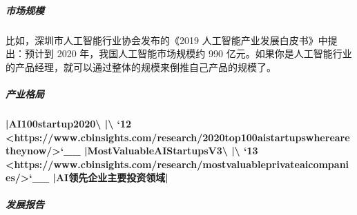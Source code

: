 \documentclass[letterpaper,11pt,english]{sphinxmanual}
\begin{document}
\subparagraph{市场规模}
\label{\detokenize{chapter_project/AI_industry_analysis:id5}}
比如，深圳市人工智能行业协会发布的《2019
人工智能产业发展白皮书》中提出：预计到 2020 年，我国人工智能市场规模约
990
亿元。如果你是人工智能行业的产品经理，就可以通过整体的规模来倒推自己产品的规模了。
%
\begin{footnote}[641]\sphinxAtStartFootnote
{}
%
\end{footnote}


\subparagraph{产业格局}
\label{\detokenize{chapter_project/AI_industry_analysis:id6}}
\begin{center}\end{center}%
\begin{footnote}[642]\sphinxAtStartFootnote
{}
%
\end{footnote} \begin{center}\end{center}
{\color{red}\bfseries{}|AI\sphinxhyphen{}100\sphinxhyphen{}startup\sphinxhyphen{}2020\textbackslash{} |\textbackslash{} `12 <https://www.cbinsights.com/research/2020\sphinxhyphen{}top\sphinxhyphen{}100\sphinxhyphen{}ai\sphinxhyphen{}startups\sphinxhyphen{}where\sphinxhyphen{}are\sphinxhyphen{}they\sphinxhyphen{}now/>`\_\_
|Most\sphinxhyphen{}Valuable\sphinxhyphen{}AI\sphinxhyphen{}Startups\sphinxhyphen{}V3\textbackslash{} |\textbackslash{} `13 <https://www.cbinsights.com/research/most\sphinxhyphen{}valuable\sphinxhyphen{}private\sphinxhyphen{}ai\sphinxhyphen{}companies/>`\_\_
|AI领先企业主要投资领域|} \begin{center}\end{center}


\subparagraph{发展报告}
\label{\detokenize{chapter_project/AI_industry_analysis:id7}}
%
\begin{footnote}[643]\sphinxAtStartFootnote
{}
%
\end{footnote}
%
\begin{footnote}[644]\sphinxAtStartFootnote
{}
%
\end{footnote}
\end{document}
